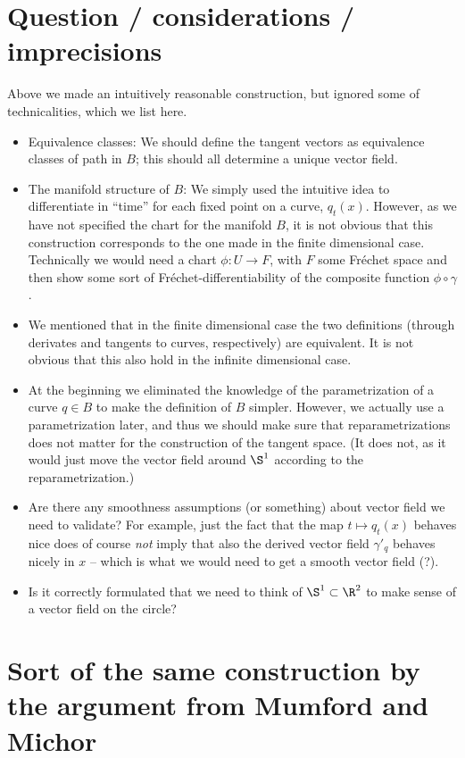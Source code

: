
\section{Question / considerations / imprecisions}
\label{sec:quest--cons}

Above we made an intuitively reasonable construction, but ignored some
of technicalities, which we list here.
\begin{itemize}
\item Equivalence classes: We should define the tangent vectors as
  equivalence classes of path in $B$; this should all determine a
  unique vector field.
\item The manifold structure of $B$: We simply used the intuitive idea
  to differentiate in ``time'' for each fixed point on a curve,
  $q_t(x)$. However, as we have not specified the chart for the
  manifold $B$, it is not obvious that this construction corresponds
  to the one made in the finite dimensional case. Technically we
  would need a chart $\phi \colon U \rightarrow F$, with $F$ some
  Fr\'echet space and then show some sort of Fr\'echet-differentiability of the
  composite function $\phi \circ \gamma$.
\item We mentioned that in the finite dimensional case the two
  definitions (through derivates and tangents to curves, respectively)
  are equivalent. It is not obvious that this also hold in the
  infinite dimensional case.
\item At the beginning we eliminated the knowledge of the
  parametrization of a curve $q \in B$ to make the definition of $B$
  simpler. However, we actually use a parametrization later, and thus
  we should make sure that reparametrizations does not matter for the
  construction of the tangent space. (It does not, as it would just
  move the vector field around $\S^1$ according to the
  reparametrization.)
\item Are there any smoothness assumptions (or something) about vector
  field we need to validate? For example, just the fact that the map
  $t \mapsto q_t(x)$ behaves nice does of course \textit{not} imply
  that also the derived vector field $\gamma'_q$ behaves nicely in
  $x$ -- which is what we would need to get a smooth vector field
  (?).
\item Is it correctly formulated that we need to think of $\S^1
  \subset \R^2$ to make sense of a vector field on the circle?
\end{itemize}

\section{Sort of the same construction by the argument from Mumford and Michor}
\label{sec:defin-metr-tang}

